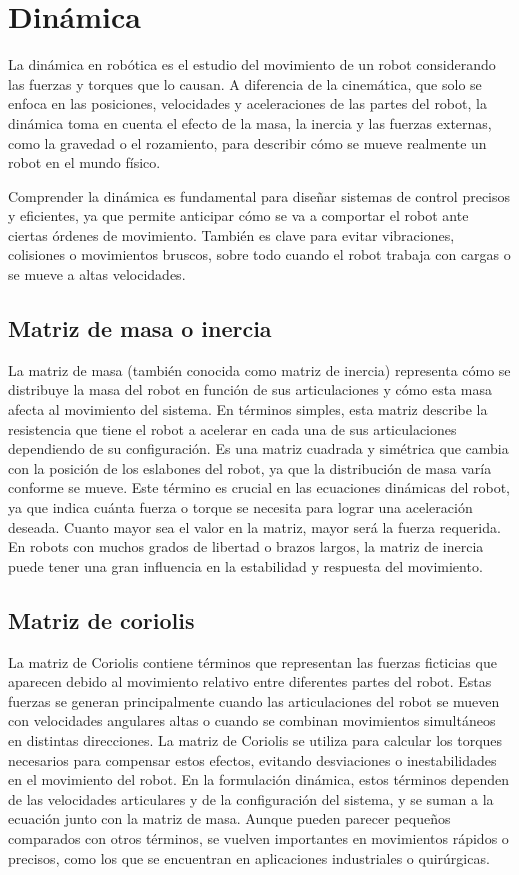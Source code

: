 \section{Dinámica} \label{sec:dinamica}

La dinámica en robótica es el estudio del movimiento de un robot considerando las fuerzas y torques que lo causan. A diferencia de la cinemática, que solo se enfoca en las posiciones, velocidades y aceleraciones de las partes del robot, la dinámica toma en cuenta el efecto de la masa, la inercia y las fuerzas externas, como la gravedad o el rozamiento, para describir cómo se mueve realmente un robot en el mundo físico.


Comprender la dinámica es fundamental para diseñar sistemas de control precisos y eficientes, ya que permite anticipar cómo se va a comportar el robot ante ciertas órdenes de movimiento. También es clave para evitar vibraciones, colisiones o movimientos bruscos, sobre todo cuando el robot trabaja con cargas o se mueve a altas velocidades.


\subsection{Matriz de masa o inercia}
La matriz de masa (también conocida como matriz de inercia) representa cómo se distribuye la masa del robot en función de sus articulaciones y cómo esta masa afecta al movimiento del sistema. En términos simples, esta matriz describe la resistencia que tiene el robot a acelerar en cada una de sus articulaciones dependiendo de su configuración. Es una matriz cuadrada y simétrica que cambia con la posición de los eslabones del robot, ya que la distribución de masa varía conforme se mueve. Este término es crucial en las ecuaciones dinámicas del robot, ya que indica cuánta fuerza o torque se necesita para lograr una aceleración deseada. Cuanto mayor sea el valor en la matriz, mayor será la fuerza requerida. En robots con muchos grados de libertad o brazos largos, la matriz de inercia puede tener una gran influencia en la estabilidad y respuesta del movimiento.


\subsection{Matriz de coriolis}
La matriz de Coriolis contiene términos que representan las fuerzas ficticias que aparecen debido al movimiento relativo entre diferentes partes del robot. Estas fuerzas se generan principalmente cuando las articulaciones del robot se mueven con velocidades angulares altas o cuando se combinan movimientos simultáneos en distintas direcciones. La matriz de Coriolis se utiliza para calcular los torques necesarios para compensar estos efectos, evitando desviaciones o inestabilidades en el movimiento del robot. En la formulación dinámica, estos términos dependen de las velocidades articulares y de la configuración del sistema, y se suman a la ecuación junto con la matriz de masa. Aunque pueden parecer pequeños comparados con otros términos, se vuelven importantes en movimientos rápidos o precisos, como los que se encuentran en aplicaciones industriales o quirúrgicas.

